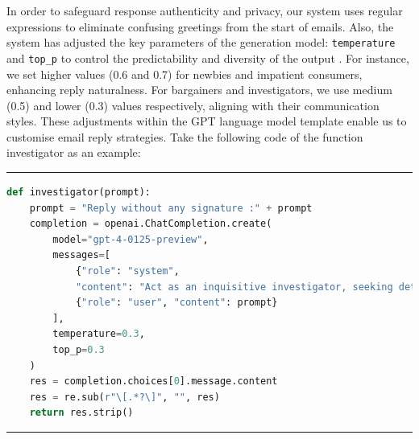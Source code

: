 \documentclass[ oneside,%
                    author={Cassie Qing Tang},
                    degree={BSc},
                     title={An Automated Response System for Disrupting Online Pet Scamming \\ },
                    subtitle={ }]{dissertation}
\begin{document}
In order to safeguard response authenticity and privacy, our system uses regular expressions to eliminate confusing greetings from the start of emails. Also, the system has adjusted the key parameters of the generation model: \texttt{temperature} and \texttt{top\_p} to control the predictability and diversity of the output \cite{noauthor_openai_nodate}. For instance, we set higher values (0.6 and 0.7) for newbies and impatient consumers, enhancing reply naturalness. For bargainers and investigators, we use medium (0.5) and lower (0.3) values respectively, aligning with their communication styles. These adjustments within the GPT language model template \cite{sanders_how_2023} enable us to customise email reply strategies. Take the following code of the function investigator as an example:
\vspace{10pt}
\noindent\hrule 
\lstset{
  basicstyle=\small\ttfamily,
  breaklines=true, 
  showstringspaces=false,
  tabsize=2,                  
  columns=fullflexible, 
}

\begin{lstlisting}[language=Python]
def investigator(prompt):
    prompt = "Reply without any signature :" + prompt
    completion = openai.ChatCompletion.create(
        model="gpt-4-0125-preview",
        messages=[
            {"role": "system",
            "content": "Act as an inquisitive investigator, seeking detailed evidence to confirm the pet sale's validity. Deny being a robot or causing trouble if questioned. Persist in the discussion, avoiding repeat questions and maintaining a logical flow with relevant follow-ups or new queries. If receiving attachments, don't open them and respond that you cannot open them. Maintain privacy and do not use any form of greeting or address such as `Dear [name]' or `Hi [name]'. But you should also make all your reply seem a little more humane."},
            {"role": "user", "content": prompt}
        ],
        temperature=0.3,
        top_p=0.3
    )
    res = completion.choices[0].message.content
    res = re.sub(r"\[.*?\]", "", res)
    return res.strip()
\end{lstlisting}
\hrule  
\vspace{10pt}
\end{document}
